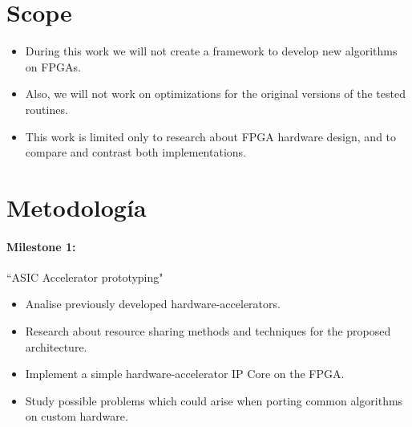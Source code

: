 \documentclass[11pt,letterpaper]{article}
\begin{document}
\section{Scope}
\begin{itemize}

\item During this work we will not create a framework to develop new algorithms on FPGAs. 
\item Also, we will not work on optimizations for the original versions of the tested routines.

\item This work is limited only to research about FPGA hardware design, and to compare and contrast both implementations.
\end{itemize}



\section{Metodología}


\paragraph{Milestone 1:} ``ASIC Accelerator prototyping"
\begin{itemize}
\item Analise previously developed hardware-accelerators.
\item Research about resource sharing methods and techniques for the proposed architecture.
\item Implement a simple hardware-accelerator IP Core on the FPGA.
\item Study possible problems which could arise when porting common algorithms on custom hardware.
\end{itemize}
\end{document}
